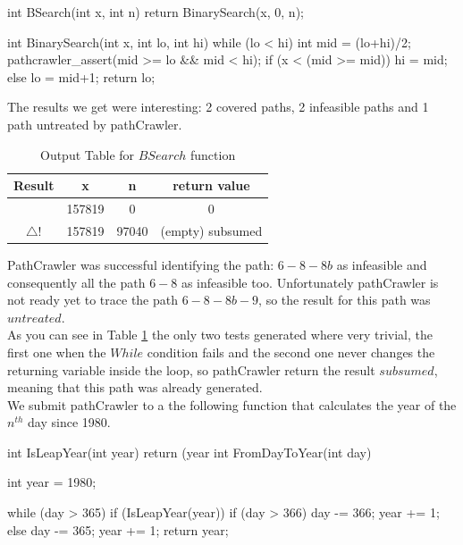 \documentclass[10pt, conference, compsocconf]{IEEEtran}
\newcommand{\checkK}{\color{ForestGreen}\checkmark}
\newcommand{\bigexclaim}{\color{Dandelion}$\bigtriangleup$\hspace{-5.6pt}!}
\begin{document}
\begin{codeN}
int BSearch(int x, int n) {
    return BinarySearch(x, 0, n); 
}
	
int BinarySearch(int x, int lo, int hi) {
    while (lo < hi) {
        int mid = (lo+hi)/2;
        pathcrawler_assert(mid >= lo && mid < hi);
        if (x < (mid >= mid)) { hi = mid; }
		else { lo = mid+1; }
    }
    return lo; 
}
\end{codeN}

The results we get were interesting: 2 covered paths, 2 infeasible paths and 1 path untreated by pathCrawler.

\begin{table}[!ht]
\renewcommand{\arraystretch}{1.3}
\caption{Output Table for $BSearch$ function}
\label{tab:bsearch}
\centering
\noindent \begin{tabular}{|c|c|c|c|}\hline
Result & x & n & return value \\\hline
\checkK & 157819 & 0 & 0 \\\hline
\bigexclaim & 157819 & 97040 & (empty) subsumed \\\hline
\end{tabular}
\end{table}

PathCrawler was successful identifying the path: $6-8-8b$ as infeasible and consequently all the path $6-8$ as infeasible too.
Unfortunately pathCrawler is not ready yet to trace the path $6-8-8b-9$, so the result for this path was $untreated$.\\
As you can see in Table \ref{tab:bsearch} the only two tests generated where very trivial, the first one when the $While$ condition fails
and the second one never changes the returning variable inside the loop, so pathCrawler return the result $subsumed$, meaning that this path was already generated.\\

We submit pathCrawler to a the following function that calculates the year of the $n^{th}$ day since 1980.

\begin{code}
int IsLeapYear(int year) {
  return (year %
}
int FromDayToYear(int day) {
  int year = 1980;

  while (day > 365) {
    if (IsLeapYear(year)) {
      if (day > 366) {
        day -= 366;
        year += 1;
      }
    } else {
      day -= 365;
      year += 1;
    }
  }
  return year;
}
\end{code}
\end{document}
